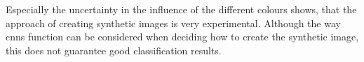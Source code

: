 Especially the uncertainty in the influence of the different colours shows, that the approach of creating synthetic images is very experimental. Although the way cnns function can be considered when deciding how to create the synthetic image, this does not guarantee good classification results.

